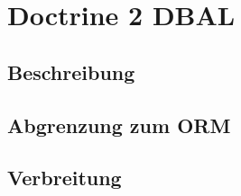 \section{Doctrine 2 DBAL}
\subsection{Beschreibung}
\subsection{Abgrenzung zum ORM}
\subsection{Verbreitung}

